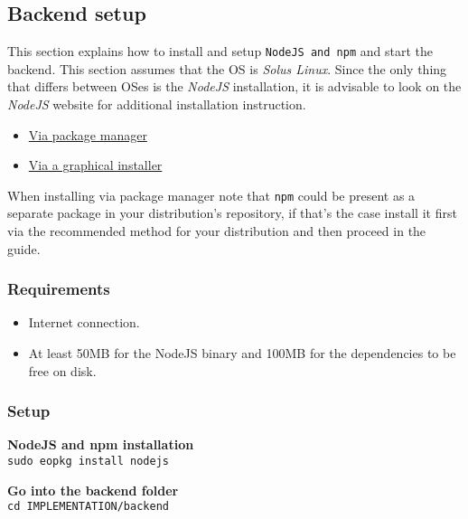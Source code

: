 \subsection{Backend setup}

This section explains how to install and setup \texttt{NodeJS and npm} and start the backend.
This section assumes that the OS is \textit{Solus Linux}. Since the only thing that differs between OSes is the \textit{NodeJS} installation, it is advisable to look on the \textit{NodeJS} website for additional installation instruction.

\begin{itemize}
    \item \href{https://nodejs.org/en/download/package-manager/}{Via package manager}
    \item \href{https://nodejs.org/en/download/}{Via a graphical installer}
\end{itemize}
When installing via package manager note that \texttt{npm} could be present as a separate package in your distribution's repository, if that's the case install it first via the recommended method for your distribution and then proceed in the guide.

\subsubsection{Requirements}
\begin{itemize}
    \item Internet connection.
    \item At least 50MB for the NodeJS binary and 100MB for the dependencies to be free on disk.
\end{itemize}

\subsubsection{Setup}
\vspace{0.5em}
\noindent \textbf{NodeJS and npm installation}\\
\texttt{sudo eopkg install nodejs}\\
\vspace{0.3em}

\vspace{0.5em}
\noindent \textbf{Go into the backend folder}\\
\texttt{cd IMPLEMENTATION/backend}\\
\vspace{0.3em}


